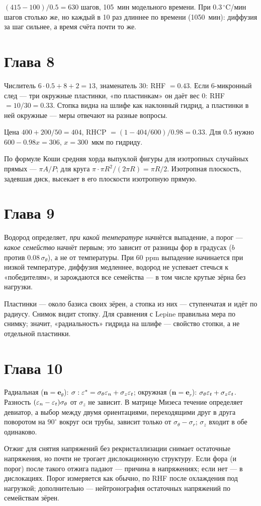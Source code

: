  $(415-100)/0.5=630$ шагов, 105~мин модельного времени. При 0.3\,$^\circ$C/мин шагов столько же,
но каждый в 10 раз длиннее по времени (1050~мин): диффузия за шаг сильнее, а время счёта почти то же.

\section*{Глава 8}
 Числитель $6\cdot0.5+8+2=13$, знаменатель 30: RHF $=0.43$. Если 6-микронный след --- три
окружные пластинки, «по пластинкам» он даёт вес 0: RHF $=10/30=0.33$. Стопка видна на шлифе как
наклонный гидрид, а пластинки в ней окружные --- меры отвечают на разные вопросы.

 Цена $400+200/50=404$, RHCP $=(1-404/600)/0.98=0.33$. Для 0.5 нужно
$600-0.98x=306$, $x=300$~мкм по гидриду.

 По формуле Коши средняя хорда выпуклой фигуры для изотропных случайных прямых ---
$\pi A/P$; для круга $\pi\cdot\pi R^2/(2\pi R)=\pi R/2$. Изотропная плоскость, задевшая диск, высекает
в его плоскости изотропную прямую.

\section*{Глава 9}
 Водород определяет, \emph{при какой температуре} начнётся выпадение, а порог --- \emph{какое
семейство} начнёт первым; это зависит от разницы фор в градусах ($b$ против $0.08\,\sigma_\theta$),
а не от температуры. При 60 ppm выпадение начинается при низкой температуре, диффузия медленнее,
водород не успевает стечься к «победителям», и зарождаются все семейства --- в том числе крутые
зёрна без нагрузки.

 Пластинки --- около базиса своих зёрен, а стопка из них --- ступенчатая и идёт по радиусу.
Снимок видит стопку. Для сравнения с Lepine правильна мера по снимку; значит, «радиальность»
гидрида на шлифе --- свойство стопки, а не отдельной пластинки.

\section*{Глава 10}
 Радиальная ($\mathbf n=\mathbf e_\theta$): $\sigma:\varepsilon^*=\sigma_\theta\varepsilon_n+\sigma_z\varepsilon_t$; окружная
($\mathbf n=\mathbf e_r$): $\sigma_\theta\varepsilon_t+\sigma_z\varepsilon_t$. Разность $(\varepsilon_n-\varepsilon_t)\sigma_\theta$ от
$\sigma_z$ не зависит. В матрице Мизеса течение определяет девиатор, а выбор между двумя
ориентациями, переходящими друг в друга поворотом на $90^\circ$ вокруг оси трубы, зависит только
от $\sigma_\theta-\sigma_r$; $\sigma_z$ входит в обе одинаково.

 Отжиг для снятия напряжений без рекристаллизации снимает остаточные напряжения, но
почти не трогает дислокационную структуру. Если фора (и порог) после такого отжига падают ---
причина в напряжениях; если нет --- в дислокациях. Порог измеряется как обычно, по RHF после
охлаждения под нагрузкой; дополнительно --- нейтронография остаточных напряжений по семействам зёрен.
